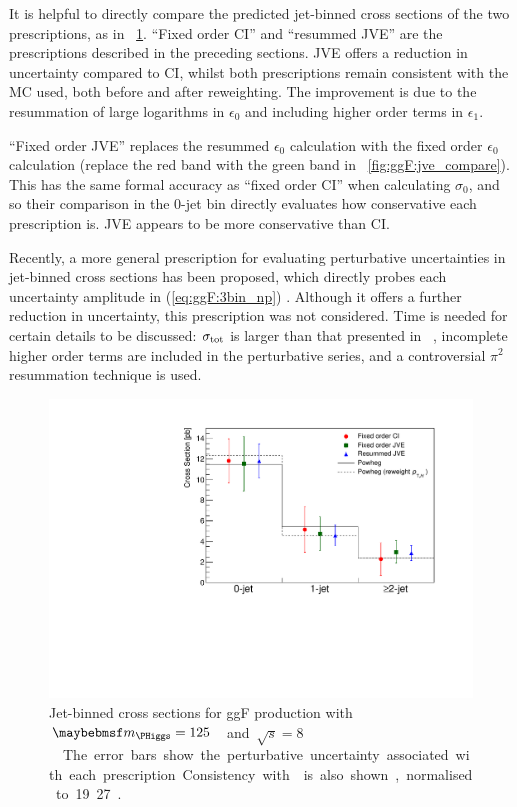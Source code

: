 It is helpful to directly compare the predicted jet-binned cross sections of the two 
prescriptions, as in \Figure~\ref{fig:signal:jetbin_xs_summary}. ``Fixed order CI'' and 
``resummed JVE'' are the prescriptions described in the preceding sections. JVE offers a 
reduction in uncertainty compared to CI, whilst both prescriptions remain consistent with 
the  MC used, both before and after \ptH reweighting. The 
improvement is due to the resummation of large logarithms in $\epsilon_0$ and including 
higher order terms in $\epsilon_1$.

``Fixed order JVE'' replaces the resummed $\epsilon_0$ calculation with the fixed order 
$\epsilon_0$ calculation (\ie replace the red band with the green band in 
\Figure~\ref{fig:ggF:jve_compare}). This has the same formal accuracy as ``fixed order CI'' 
when calculating $\sigma_0$, and so their comparison in the 0-jet bin directly evaluates 
how conservative each prescription is. JVE appears to be more conservative than CI.

Recently, a more general prescription for evaluating perturbative uncertainties in 
jet-binned cross sections has been proposed, which directly probes each uncertainty 
amplitude in (\ref{eq:ggF:3bin_np}) \cite{BLTPW:2013}. Although it offers a further 
reduction in uncertainty, this prescription was not considered. Time is needed for certain 
details to be discussed: $\sigma_{\text{tot}}$ is larger than that presented in 
\Reference~\cite{YR3}, incomplete higher order terms are included in the perturbative 
series, and a controversial $\pi^2$ resummation technique is used.

\begin{figure}[t]
	\includegraphics[width=\largefigwidth]{custom_images/ggF_xs_jetbin}
	\caption{Jet-binned cross sections for ggF production with \unit{$\mH = 125$}{\GeV} and 
	\unit{$\sqrt{s} = 8$}{\TeV}. The error bars show the perturbative uncertainty 
	associated with each prescription. Consistency with  is also shown, normalised to \unit{19.27}{\pico\barn}.}
	\label{fig:signal:jetbin_xs_summary}
\end{figure}
